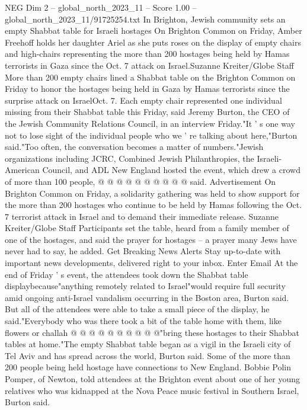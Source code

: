 \begin{textsample}{NEG Dim 2 – global\_north\_2023\_11 – Score 1.00 – global\_north\_2023\_11/91725254.txt}  \label{ex:f2_neg_142}
In Brighton, Jewish community sets an empty Shabbat table for Israeli hostages On Brighton Common on Friday, Amber Freehoff holds her daughter Ariel as she puts roses on the display of empty chairs and high-chairs representing the more than 200 hostages being held by Hamas terrorists in Gaza since the Oct. 7 attack on Israel.Suzanne Kreiter/Globe Staff More than 200 empty chairs lined a Shabbat table on the Brighton Common on Friday to honor the hostages being held in Gaza by Hamas terrorists since the surprise attack on IsraelOct. 7.
Each empty chair represented one individual missing from their Shabbat table this Friday, said Jeremy Burton, the CEO of the Jewish Community Relations Council, in an interview Friday."It ' s one way not to lose sight of the individual people who we ' re talking about here,"Burton said."Too often, the conversation becomes a matter of numbers."Jewish organizations including JCRC, Combined Jewish Philanthropies, the Israeli-American Council, and ADL New England hosted the event, which drew a crowd of more than 100 people, @ @ @ @ @ @ @ @ @ @ said.
Advertisement On Brighton Common on Friday, a solidarity gathering was held to show support for the more than 200 hostages who continue to be held by Hamas following the Oct. 7 terrorist attack in Israel and to demand their immediate release.
Suzanne Kreiter/Globe Staff Participants set the table, heard from a family member of one of the hostages, and said the prayer for hostages -- a prayer many Jews have never had to say, he added.
Get Breaking News Alerts Stay up-to-date with important news developments, delivered right to your inbox.
Enter Email At the end of Friday ' s event, the attendees took down the Shabbat table displaybecause"anything remotely related to Israel"would require full security amid ongoing anti-Israel vandalism occurring in the Boston area, Burton said.
But all of the attendees were able to take a small piece of the display, he said."Everybody who was there took a bit of the table home with them, like flowers or challah @ @ @ @ @ @ @ @ @ @"bring these hostages to their Shabbat tables at home."The empty Shabbat table began as a vigil in the Israeli city of Tel Aviv and has spread across the world, Burton said.
Some of the more than 200 people being held hostage have connections to New England.
Bobbie Polin Pomper, of Newton, told attendees at the Brighton event about one of her young relatives who was kidnapped at the Nova Peace music festival in Southern Israel, Burton said.

\end{textsample}
